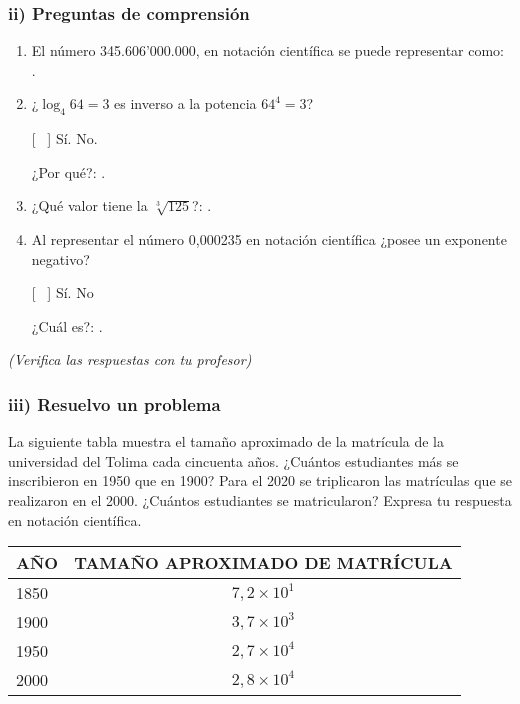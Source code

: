 \documentclass[12pt,a4paper]{article}
\begin{document}
\vspace{1cm}

\subsubsection*{ii) Preguntas de comprensión}

\begin{enumerate}
\item El número 345.606'000.000, en notación científica se puede representar como: \underline{\hspace{4cm}}.

\item ¿$\log_4 64 = 3$ es inverso a la potencia $64^4 = 3$?

[ \ ] Sí. \qquad [ \ ] No.

¿Por qué?: \underline{\hspace{5cm}}.

\item ¿Qué valor tiene la $\sqrt[3]{125}$?: \underline{\hspace{3cm}}.

\item Al representar el número 0,000235 en notación científica ¿posee un exponente negativo?

[ \ ] Sí. \qquad [ \ ] No

¿Cuál es?: \underline{\hspace{4cm}}.
\end{enumerate}

\vspace{0.5cm}

\textit{(Verifica las respuestas con tu profesor)}

\vspace{1cm}

\subsubsection*{iii) Resuelvo un problema}

La siguiente tabla muestra el tamaño aproximado de la matrícula de la universidad del Tolima cada cincuenta años. ¿Cuántos estudiantes más se inscribieron en 1950 que en 1900? Para el 2020 se triplicaron las matrículas que se realizaron en el 2000. ¿Cuántos estudiantes se matricularon? Expresa tu respuesta en notación científica.

\vspace{0.5cm}

\begin{center}
\begin{tabular}{|l|c|}
\hline
\cellcolor{fondoazul}\textbf{AÑO} & \textbf{TAMAÑO APROXIMADO DE MATRÍCULA} \\
\hline
1850 & $7,2 \times 10^1$ \\
\hline
1900 & $3,7 \times 10^3$ \\
\hline
1950 & $2,7 \times 10^4$ \\
\hline
2000 & $2,8 \times 10^4$ \\
\hline
\end{tabular}
\end{center}
\end{document}
